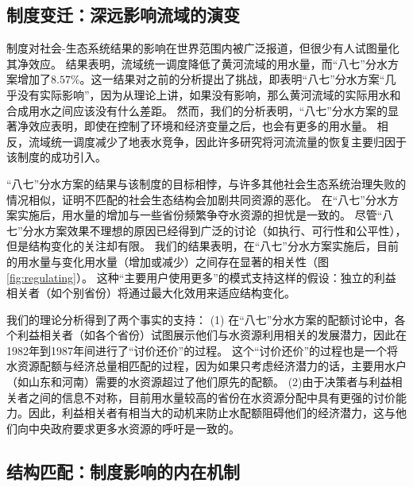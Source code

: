 \subsection{制度变迁：深远影响流域的演变}

制度对社会-生态系统结果的影响在世界范围内被广泛报道，但很少有人试图量化其净效应\cite{cumming2020a}。
结果表明，流域统一调度降低了黄河流域的用水量，而“八七”分水方案增加了$8.57\%$。这一结果对之前的分析提出了挑战，即表明“八七”分水方案“几乎没有实际影响”，因为从理论上讲，如果没有影响，那么黄河流域的实际用水和合成用水之间应该没有什么差距\cite{abadie2015,hill2021}。
然而，我们的分析表明，“八七”分水方案的显著净效应表明，即使在控制了环境和经济变量之后，也会有更多的用水量。
相反，流域统一调度减少了地表水竞争，因此许多研究将河流流量的恢复主要归因于该制度的成功引入\cite{chen2021,huangang2002,an2007}。

%
“八七”分水方案的结果与该制度的目标相悖，与许多其他社会生态系统治理失败的情况相似，证明不匹配的社会生态结构会加剧共同资源的恶化\cite{kellenberg2009,cai2016,barnes2019}。
在“八七”分水方案实施后，用水量的增加与一些省份频繁争夺水资源的担忧是一致的。
尽管“八七”分水方案效果不理想的原因已经得到广泛的讨论（如执行、可行性和公平性），但是结构变化的关注却有限。
我们的结果表明，在“八七”分水方案实施后，目前的用水量与变化用水量（增加或减少）之间存在显著的相关性（图\ref{fig:regulating}）。
这种“主要用户使用更多”的模式支持这样的假设：独立的利益相关者（如个别省份）将通过最大化效用来适应结构变化。

我们的理论分析得到了两个事实的支持：
(1) 在“八七”分水方案的配额讨论中，各个利益相关者（如各个省份）试图展示他们与水资源利用相关的发展潜力，因此在1982年到1987年间进行了“讨价还价”的过程\cite{wang2019a, wang2019d}。
这个“讨价还价”的过程也是一个将水资源配额与经济总量相匹配的过程，因为如果只考虑经济潜力的话，主要用水户（如山东和河南）需要的水资源超过了他们原先的配额\cite{zuo2020}。
(2)由于决策者与利益相关者之间的信息不对称，目前用水量较高的省份在水资源分配中具有更强的讨价能力。因此，利益相关者有相当大的动机来防止水配额阻碍他们的经济潜力，这与他们向中央政府要求更多水资源的呼吁是一致的\cite{wang2019a, wang2019d}。

\subsection{结构匹配：制度影响的内在机制}

